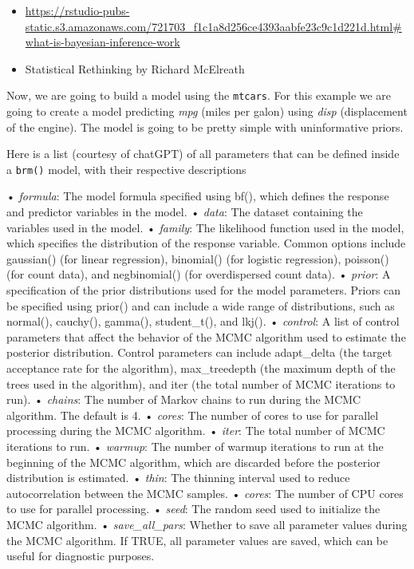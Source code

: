 \documentclass[
]{book}
\providecommand{\tightlist}{%
  \setlength{\itemsep}{0pt}\setlength{\parskip}{0pt}}
\begin{document}
\begin{itemize}
\tightlist
\item
  \url{https://rstudio-pubs-static.s3.amazonaws.com/721703_f1c1a8d256ce4393aabfe23c9c1d221d.html\#what-is-bayesian-inference-work}
\item
  Statistical Rethinking by Richard McElreath
\end{itemize}

Now, we are going to build a model using the \texttt{mtcars}. For this example we are going to create a model predicting \emph{mpg} (miles per galon) using \emph{disp} (displacement of the engine). The model is going to be pretty simple with uninformative priors.

Here is a list (courtesy of chatGPT) of all parameters that can be defined inside a \texttt{brm()} model, with their respective descriptions

• \emph{formula}: The model formula specified using bf(), which defines the response and predictor variables in the model.
• \emph{data}: The dataset containing the variables used in the model.
• \emph{family}: The likelihood function used in the model, which specifies the distribution of the response variable. Common options include gaussian() (for linear regression), binomial() (for logistic regression), poisson() (for count data), and negbinomial() (for overdispersed count data).
• \emph{prior}: A specification of the prior distributions used for the model parameters. Priors can be specified using prior() and can include a wide range of distributions, such as normal(), cauchy(), gamma(), student\_t(), and lkj().
• \emph{control}: A list of control parameters that affect the behavior of the MCMC algorithm used to estimate the posterior distribution. Control parameters can include adapt\_delta (the target acceptance rate for the algorithm), max\_treedepth (the maximum depth of the trees used in the algorithm), and iter (the total number of MCMC iterations to run).
• \emph{chains}: The number of Markov chains to run during the MCMC algorithm. The default is 4.
• \emph{cores}: The number of cores to use for parallel processing during the MCMC algorithm.
• \emph{iter}: The total number of MCMC iterations to run.
• \emph{warmup}: The number of warmup iterations to run at the beginning of the MCMC algorithm, which are discarded before the posterior distribution is estimated.
• \emph{thin}: The thinning interval used to reduce autocorrelation between the MCMC samples.
• \emph{cores}: The number of CPU cores to use for parallel processing.
• \emph{seed}: The random seed used to initialize the MCMC algorithm.
• \emph{save\_all\_pars}: Whether to save all parameter values during the MCMC algorithm. If TRUE, all parameter values are saved, which can be useful for diagnostic purposes.
\end{document}
